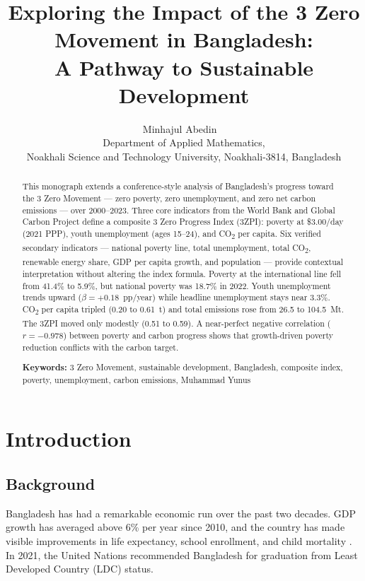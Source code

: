 \documentclass[12pt,a4paper]{article}
\title{Exploring the Impact of the 3 Zero Movement in Bangladesh:\\
A Pathway to Sustainable Development}
\author{Minhajul Abedin ~\orcidlink{0009-0006-5654-632X} \\
\small Department of Applied Mathematics,\\
\small Noakhali Science and Technology University, Noakhali-3814, Bangladesh}
\date{}
\begin{document}
\maketitle

\begin{abstract}
This monograph extends a conference-style analysis of Bangladesh's progress toward the 3 Zero Movement --- zero poverty, zero unemployment, and zero net carbon emissions --- over 2000--2023. Three core indicators from the World Bank and Global Carbon Project define a composite 3 Zero Progress Index (3ZPI): poverty at \$3.00/day (2021 PPP), youth unemployment (ages 15--24), and CO\textsubscript{2} per capita. Six verified secondary indicators --- national poverty line, total unemployment, total CO\textsubscript{2}, renewable energy share, GDP per capita growth, and population --- provide contextual interpretation without altering the index formula. Poverty at the international line fell from 41.4\% to 5.9\%, but national poverty was 18.7\% in 2022. Youth unemployment trends upward ($\beta = +0.18$~pp/year) while headline unemployment stays near 3.3\%. CO\textsubscript{2} per capita tripled (0.20 to 0.61~t) and total emissions rose from 26.5 to 104.5~Mt. The 3ZPI moved only modestly (0.51 to 0.59). A near-perfect negative correlation ($r = -0.978$) between poverty and carbon progress shows that growth-driven poverty reduction conflicts with the carbon target.

\medskip
\noindent\textbf{Keywords:} 3 Zero Movement, sustainable development, Bangladesh, composite index, poverty, unemployment, carbon emissions, Muhammad Yunus
\end{abstract}

\section{Introduction}

\subsection{Background}

Bangladesh has had a remarkable economic run over the past two decades. GDP growth has averaged above 6\% per year since 2010, and the country has made visible improvements in life expectancy, school enrollment, and child mortality \citep{wb2023update}. In 2021, the United Nations recommended Bangladesh for graduation from Least Developed Country (LDC) status.
\end{document}
